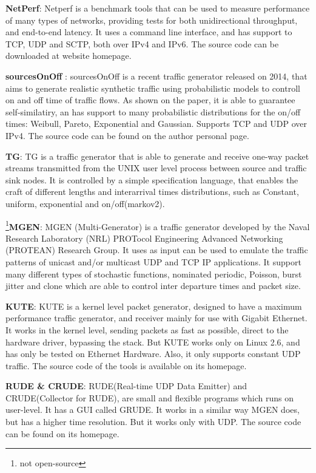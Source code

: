\textbf{NetPerf}\cite{web-netperf}: Netperf is a benchmark tools that can be used to measure performance of many types of networks, providing tests for both unidirectional throughput, and end-to-end latency. It uses a command line interface, and has support to TCP, UDP and SCTP, both over IPv4 and IPv6. The source code can be downloaded at website homepage.


\textbf{sourcesOnOff}\cite{sourcesonoff-paper} \cite{web-sourcesonoff}: sourcesOnOff is a recent traffic generator released on 2014, that aims to generate realistic synthetic traffic using probabilistic models to controll on and off time of traffic flows. As shown on the paper, it is able to guarantee self-similatiry, an has support to many probabilistic distributions for the on/off times: Weibull, Pareto, Exponential  and Gaussian. Supports TCP and UDP over IPv4. The source code can be found on the author personal page.


\textbf{TG}\cite{web-tg}: TG is a traffic generator that is able to generate and receive one-way packet streams transmitted from the UNIX user level process between source and traffic sink nodes. It is controlled by a simple specification language, that enables the craft of different lengths and interarrival times distributions, such as Constant, uniform, exponential and on/off(markov2).


\footnote{not open-source}\textbf{MGEN}\cite{web-mgen}: MGEN (Multi-Generator) is a traffic generator developed by the Naval Research Laboratory (NRL) PROTocol Engineering Advanced Networking (PROTEAN) Research Group. It uses as input can be used to emulate the traffic patterns of unicast and/or multicast UDP and TCP IP applications. It support many different types of stochastic functions, nominated periodic, Poisson, burst jitter and clone which are able to control inter departure times and packet size.


\textbf{KUTE}\cite{web-kute}: KUTE is a kernel level packet generator, designed to have a maximum performance traffic generator, and receiver mainly for use with Gigabit Ethernet. It works in the kernel level, sending packets as fast as possible, direct to the hardware driver, bypassing the stack. But KUTE works only on Linux 2.6, and has only be tested on Ethernet Hardware. Also, it only supports constant UDP traffic. The source code of the tools is available on its homepage.


\textbf{RUDE \& CRUDE}\cite{web-rude-crude}: RUDE(Real-time UDP Data Emitter) and CRUDE(Collector for RUDE), are small and flexible programs which runs on user-level. It has a GUI called GRUDE. It works in a similar way MGEN does, but has a higher time resolution. But it works only with UDP. The source code can be found on its homepage.



